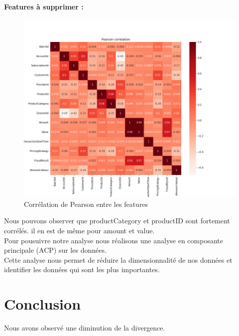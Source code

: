\documentclass{article}
\begin{document}
\paragraph{Features à supprimer :}
\begin{figure}[h]
    \centering
    \includegraphics[scale=0.4]{./images/correlation_pearson.png}
    \caption{Corrélation de Pearson entre les features} 
\end{figure}





Nous pouvons observer que productCategory et productID sont fortement corrélés.
il en est de même pour amount et value.\\

Pour pousuivre notre analyse nous réalisons une analyse en composante principale (ACP) sur les données.\\
Cette analyse nous permet de réduire la dimensionnalité de nos données et identifier les données qui sont les plus importantes.\\

\section{Conclusion}
Nous avons observé une diminution de la divergence.
\end{document}
